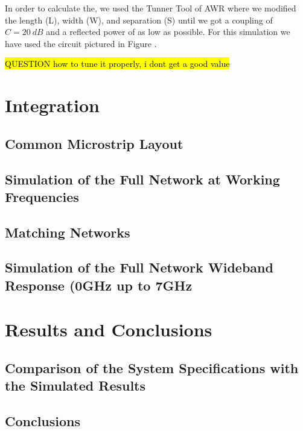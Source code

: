 \documentclass[12pt]{report} %
\newcommand{\question}[1]{\sethlcolor{red}\hl{QUESTION #1}}
\begin{document}
In order to calculate the, we used the Tunner Tool of AWR where we modified the length (L), width (W), and separation (S) until we got a coupling of $C = 20 \ dB$ and a reflected power of as low as possible. For this simulation we have used the circuit pictured in Figure .

\question{how to tune it properly, i dont get a good value}






\chapter{Integration}

\section{Common Microstrip Layout}

\section{Simulation of the Full Network at Working Frequencies}

\section{Matching Networks} %

\section{Simulation of the Full Network Wideband Response (0GHz up to 7GHz}







\chapter{Results and Conclusions}

\section{Comparison of the System Specifications with the Simulated Results}

\section{Conclusions} %
\end{document}
